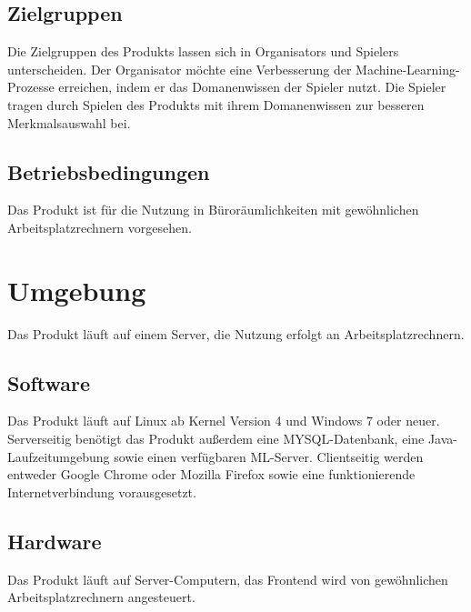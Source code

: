 \documentclass[a4paper]{scrreprt}
\begin{document}
    \section{Zielgruppen}
    Die Zielgruppen des \Gls{Produkt}s lassen sich in \Glspl{Organisator} und \Glspl{Spieler} unterscheiden.
    Der \Gls{Organisator} möchte eine Verbesserung der Machine-Learning-Prozesse erreichen, indem er das \Gls{Domanenwissen} der \Gls{Spieler} nutzt.
    Die \Gls{Spieler} tragen durch Spielen des \Gls{Produkt}s mit ihrem \Gls{Domanenwissen} zur besseren Merkmalsauswahl bei.


    \section{Betriebsbedingungen}
    Das \Gls{Produkt} ist für die Nutzung in Büroräumlichkeiten mit gewöhnlichen Arbeitsplatzrechnern vorgesehen.

    \chapter{Umgebung}
    Das \Gls{Produkt} läuft auf einem Server, die Nutzung erfolgt an Arbeitsplatzrechnern.

    \section{Software}
    Das \Gls{Produkt} läuft auf Linux ab Kernel Version 4 und Windows 7 oder neuer.
    Serverseitig benötigt das Produkt außerdem eine MYSQL-Datenbank, eine Java-Laufzeitumgebung sowie einen verfügbaren \Gls{ML-Server}.
    Clientseitig werden entweder Google Chrome oder Mozilla Firefox sowie eine funktionierende Internetverbindung vorausgesetzt.

    \section{Hardware}
    Das \Gls{Produkt} läuft auf Server-Computern, das Frontend wird von gewöhnlichen Arbeitsplatzrechnern angesteuert.
\end{document}
